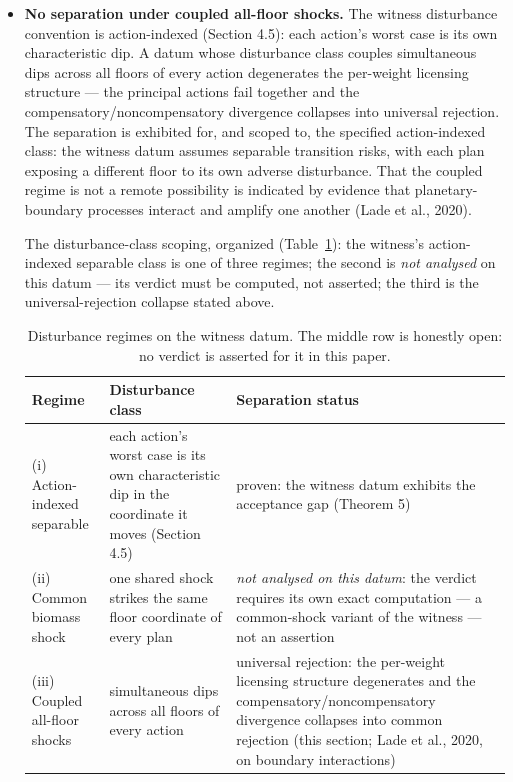 \documentclass[3p,11pt]{elsarticle}
\begin{document}
\begin{itemize}
  \(\mathcal{V}_{\mathrm{typ}} \subseteq \mathcal{V}_{\mathrm{weak}} \subseteq \mathcal{V}_{\mathrm{phys}}\)
  is a theorem about the defined operators under common action and
  disturbance classes, common safe-set inclusion, common horizon, common
  tube semantics, and common terminal condition. It does not establish a
  universal ranking of endpoint, weak, and strong sustainability
  doctrines.
\item
  \textbf{No separation under coupled all-floor shocks.} The witness
  disturbance convention is action-indexed (Section 4.5): each action's
  worst case is its own characteristic dip. A datum whose disturbance
  class couples simultaneous dips across all floors of every action
  degenerates the per-weight licensing structure --- the principal
  actions fail together and the compensatory/noncompensatory divergence
  collapses into universal rejection. The separation is exhibited for, and scoped to, the specified action-indexed class: the witness datum assumes separable transition risks, with each plan exposing a different floor to its own adverse disturbance. That the coupled regime is not a remote possibility is indicated by evidence that planetary-boundary processes interact and amplify one another (Lade et al., 2020).

\medskip

\noindent The disturbance-class scoping, organized
(Table~\ref{tab:disturbance}): the witness's action-indexed separable
class is one of three regimes; the second is \emph{not analysed} on this
datum --- its verdict must be computed, not asserted; the third is the
universal-rejection collapse stated above.

\begin{table}[htbp]
\centering
\small
\caption{Disturbance regimes on the witness datum. The middle row is
honestly open: no verdict is asserted for it in this paper.}
\label{tab:disturbance}
\begin{tabular}{@{}p{3.1cm}p{4.0cm}p{6.3cm}@{}}
\toprule
Regime & Disturbance class & Separation status \\
\midrule
(i) Action-indexed separable & each action's worst case is its own characteristic dip in the coordinate it moves (Section 4.5) & proven: the witness datum exhibits the acceptance gap (Theorem 5) \\
(ii) Common biomass shock & one shared shock strikes the same floor coordinate of every plan & \emph{not analysed on this datum}: the verdict requires its own exact computation --- a common-shock variant of the witness --- not an assertion \\
(iii) Coupled all-floor shocks & simultaneous dips across all floors of every action & universal rejection: the per-weight licensing structure degenerates and the compensatory/noncompensatory divergence collapses into common rejection (this section; Lade et al., 2020, on boundary interactions) \\
\bottomrule
\end{tabular}
\end{table}


\end{itemize}
\end{document}
